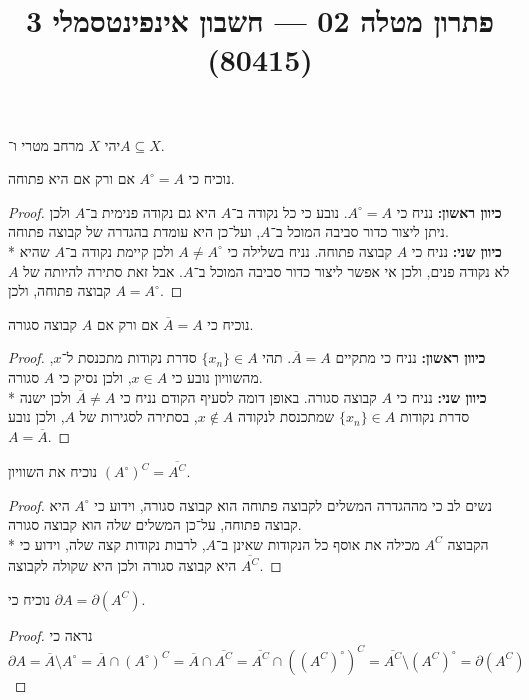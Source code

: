 
\title{פתרון מטלה 02 --- חשבון אינפינטסמלי 3 (80415)}


\maketitle
\maketitleprint{}

\Question{}
יהי $X$ מרחב מטרי ו־$A \subseteq X$.

\Subquestion{}
נוכיח כי $A^\circ = A$ אם ורק אם היא פתוחה.
\begin{proof}
	\textbf{כיוון ראשון:}
	נניח כי $A^\circ = A$. נובע כי כל נקודה ב־$A$ היא גם נקודה פנימית ב־$A$ ולכן ניתן ליצור כדור סביבה המוכל ב־$A$, ועל־כן היא עומדת בהגדרה של קבוצה פתוחה. \\*
	\textbf{כיוון שני:}
	נניח כי $A$ קבוצה פתוחה. נניח בשלילה כי $A \ne A^\circ$ ולכן קיימת נקודה ב־$A$ שהיא לא נקודה פנים, ולכן אי אפשר ליצור כדור סביבה המוכל ב־$A$. אבל זאת סתירה להיותה של $A$ קבוצה פתוחה, ולכן $A = A^\circ$.
\end{proof}

\Subquestion{}
נוכיח כי $\overline{A} = A$ אם ורק אם $A$ קבוצה סגורה.
\begin{proof}
	\textbf{כיוון ראשון:}
	נניח כי מתקיים $\overline{A} = A$.
	תהי $\{ x_n \} \in A$ סדרת נקודות מתכנסת ל־$x$, מהשוויון נובע כי $x \in A$, ולכן נסיק כי $A$ סגורה. \\*
	\textbf{כיוון שני:}
	נניח כי $A$ קבוצה סגורה. באופן דומה לסעיף הקודם נניח כי $\overline{A} \ne A$ ולכן ישנה סדרת נקודות $\{x_n\} \in A$ שמתכנסת לנקודה $x \not\in A$, בסתירה לסגירות של $A$, ולכן נובע $A = \overline{A}$.
\end{proof}

\Subquestion{}
נוכיח את השוויון ${(A^\circ)}^C = \overline{A^C}$.
\begin{proof}
	נשים לב כי מההגדרה המשלים לקבוצה פתוחה הוא קבוצה סגורה, וידוע כי $A^\circ$ היא קבוצה פתוחה, על־כן המשלים שלה הוא קבוצה סגורה. \\*
	הקבוצה $A^C$ מכילה את אוסף כל הנקודות שאינן ב־$A$, לרבות נקודות קצה שלה, וידוע כי היא קבוצה סגורה ולכן היא שקולה לקבוצה $\overline{A^C}$.
\end{proof}

\Subquestion{}
נוכיח כי $\partial A = \partial (A^C)$.
\begin{proof}
	נראה כי
	\[
		\partial A
		= \overline{A} \setminus A^\circ
		= \overline{A} \cap {(A^\circ)}^C
		= \overline{A} \cap \overline{A^C}
		= \overline{A^C} \cap {({(A^C)}^\circ)}^C
		= \overline{A^C} \setminus {(A^C)}^\circ
		= \partial (A^C)
	\]
\end{proof}

